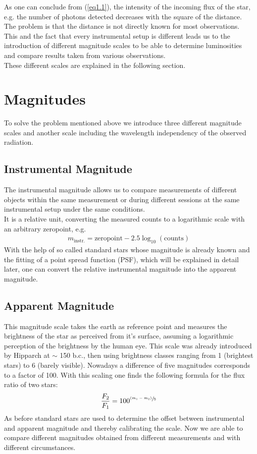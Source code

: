 As one can conclude from (\ref{eq1.1}), the intensity of the incoming flux of the star, e.g. the number of photons detected decreases with the square of the distance. The problem is that the distance is not directly known for most observations. This and the fact that every instrumental setup is different leads us to the introduction of different magnitude scales to be able to determine luminosities and compare results taken from various observations. \\
These different scales are explained in the following section.

\section{Magnitudes}
To solve the problem mentioned above we introduce three different magnitude scales and another scale including the wavelength independency of the observed radiation.
\subsection{Instrumental Magnitude}
The instrumental magnitude allows us to compare measurements of different objects within the same measurement or during different sessions at the same instrumental setup under the same conditions. \\
It is a relative unit, converting the measured counts to a logarithmic scale with an arbitrary zeropoint, e.g.
\begin{align}
		m_{\text{instr.}} = \text{zeropoint} - 2.5\log_{10}(\text{counts}) \label{eq1.4}
	\end{align}
With the help of so called standard stars whose magnitude is already known and the fitting of a point spread function (PSF), which will be explained in detail later, one can convert the relative instrumental magnitude into the apparent magnitude.
\subsection{Apparent Magnitude}
This magnitude scale takes the earth as reference point and measures the brightness of the star as perceived from it's surface, assuming a logarithmic perception of the brightness by the human eye. This scale was already introduced by Hipparch at $\sim$ 150 b.c., then using brightness classes ranging from 1 (brightest stars) to 6 (barely visible). Nowadays a difference of five magnitudes corresponds to a factor of 100.
With this scaling one finds the following formula for the flux ratio of two stars: 
\begin{align}
	\frac{F_2}{F_1} = 100^{\sfrac{(m_1-m_2)}{5}}
\end{align}
As before standard stars are used to determine the offset between instrumental and apparent magnitude and thereby calibrating the scale. Now we are able to compare different magnitudes obtained from different measurements and with different circumstances.
